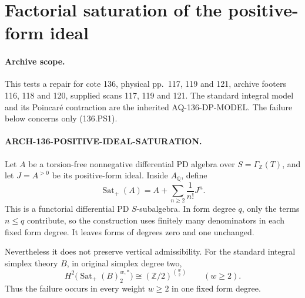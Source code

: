 \section{Factorial saturation of the positive-form ideal}

\paragraph{Archive scope.}
This tests a repair for cote 136, physical pp.~117, 119 and 121,
archive footers 116, 118 and 120, supplied scans 117, 119 and 121.
The standard integral model and its Poincaré contraction are the
inherited AQ-136-DP-MODEL. The failure below concerns only (136.PS1).

\paragraph{ARCH-136-POSITIVE-IDEAL-SATURATION.}
Let \(A\) be a torsion-free nonnegative differential PD algebra over
\(S=\Gamma_{\mathbb Z}(T)\), and let \(J=A^{>0}\) be its positive-form ideal.
Inside \(A_{\mathbb Q}\), define
\[
 \operatorname{Sat}_{+}(A)
   =A+\sum_{n\geq2}\frac{1}{n!}J^n .                \tag{136.PS1}
\]
This is a functorial differential PD \(S\)-subalgebra. In form degree \(q\),
only the terms \(n\leq q\) contribute, so the construction uses finitely
many denominators in each fixed form degree. It leaves forms of degrees
zero and one unchanged.

Nevertheless it does not preserve vertical admissibility. For the
standard integral simplex theory \(B\), in original simplex degree two,
\[
 H^2\bigl(\operatorname{Sat}_{+}(B)_2^{w,*}\bigr)
       \cong (\mathbb Z/2)^{\binom w2}
       \qquad(w\geq2).                              \tag{136.PS2}
\]
Thus the failure occurs in every weight \(w\geq2\) in one fixed form degree.

